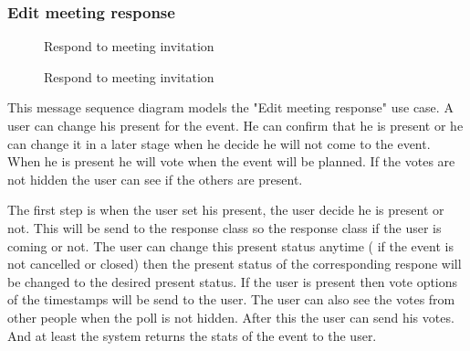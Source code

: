 	\subsubsection{Edit meeting response}
		\begin{figure}[H]
			\centering
			\begin{msc}{Respond to meeting invitation}

				\nextlevel
				\nextlevel

				\nextlevel
				\nextlevel

				\nextlevel
				\nextlevel
				\nextlevel
				\nextlevel
				\nextlevel
				
				\nextlevel
			\end{msc}
			\caption{Respond to meeting invitation}
			\label{msc:respondinvite}
		\end{figure}

		This message sequence diagram models the "Edit meeting response" use case. A user can change his present for the event. He can confirm that he is present or he can change it in a later stage when he decide he will not come to the event. When he is present he will vote when the event will be planned. If the votes are not hidden the user can see if the others are present.

		The first step is when the user set his present, the user decide he is present or not. This will be send to the response class so the response class if the user is coming or not. The user can change this present status anytime ( if the event is not cancelled or closed) then the present status of the corresponding respone will be changed to the desired present status. If the user is present then vote options of the timestamps will be send to the user. The user can also see the votes from other people when the poll is not hidden. After this the user can send his votes. And at least the system returns the stats of the event to the user.

